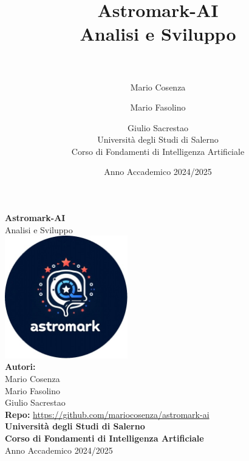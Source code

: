 \documentclass[a4paper,12pt]{report}
\title{%
  \textbf{Astromark-AI}\\[0.5cm]
  \large Analisi e Sviluppo\\[0.5cm]

  \\
}
\author{%
  Mario Cosenza \and
  Mario Fasolino \and
  Giulio Sacrestao\\[0.5cm]
  Università degli Studi di Salerno\\
  Corso di Fondamenti di Intelligenza Artificiale%
}
\date{Anno Accademico 2024/2025}
\begin{document}
\begin{titlepage}
    \centering
    \vspace*{2cm}
    {\Huge \textbf{Astromark-AI}}\\[1.5cm]
    {\Large Analisi e Sviluppo}\\[2cm]
    \includegraphics[width=0.4\textwidth]{images/astromarkLogo.jpg}\\[2cm]
    {\large \textbf{Autori:}}\\[0.5cm]
    Mario Cosenza\\
    Mario Fasolino\\
    Giulio Sacrestao\\[1cm]
    {\small \textbf{Repo:} \url{https://github.com/mariocosenza/astromark-ai}}\\[1cm]
    {\large \textbf{Università degli Studi di Salerno}}\\[0.5cm]
    {\large \textbf{Corso di Fondamenti di Intelligenza Artificiale}}\\[1cm]
    {\large Anno Accademico 2024/2025}
    \vfill
\end{titlepage}

\newpage

\pagestyle{fancy}
\fancyhf{}
\fancyfoot[C]{\thepage}

\tableofcontents
\newpage











\appendix

\end{document}
